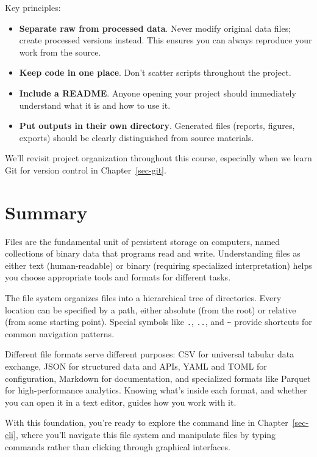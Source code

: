 \documentclass[
  letterpaper,
  DIV=11,
  numbers=noendperiod]{scrreprt}
\begin{document}
Key principles:

\begin{itemize}
\item
  \textbf{Separate raw from processed data}. Never modify original data
  files; create processed versions instead. This ensures you can always
  reproduce your work from the source.
\item
  \textbf{Keep code in one place}. Don't scatter scripts throughout the
  project.
\item
  \textbf{Include a README}. Anyone opening your project should
  immediately understand what it is and how to use it.
\item
  \textbf{Put outputs in their own directory}. Generated files (reports,
  figures, exports) should be clearly distinguished from source
  materials.
\end{itemize}

We'll revisit project organization throughout this course, especially
when we learn Git for version control in Chapter~\ref{sec-git}.

\section{Summary}\label{summary-1}

Files are the fundamental unit of persistent storage on computers, named
collections of binary data that programs read and write. Understanding
files as either text (human-readable) or binary (requiring specialized
interpretation) helps you choose appropriate tools and formats for
different tasks.

The file system organizes files into a hierarchical tree of directories.
Every location can be specified by a path, either absolute (from the
root) or relative (from some starting point). Special symbols like
\texttt{.}, \texttt{..}, and \texttt{\textasciitilde{}} provide
shortcuts for common navigation patterns.

Different file formats serve different purposes: CSV for universal
tabular data exchange, JSON for structured data and APIs, YAML and TOML
for configuration, Markdown for documentation, and specialized formats
like Parquet for high-performance analytics. Knowing what's inside each
format, and whether you can open it in a text editor, guides how you
work with it.

With this foundation, you're ready to explore the command line in
Chapter~\ref{sec-cli}, where you'll navigate this file system and
manipulate files by typing commands rather than clicking through
graphical interfaces.
\end{document}

